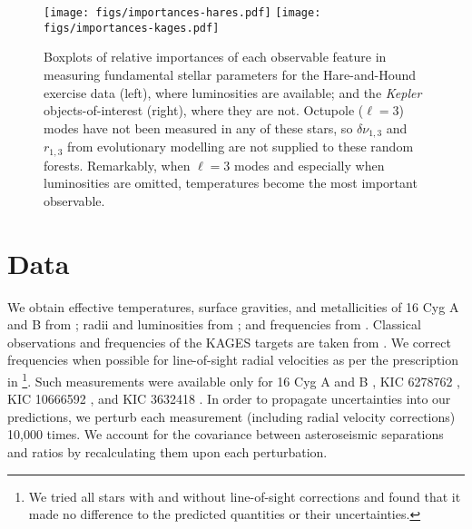 \documentclass[manuscript]{aastex}
\begin{document}
\begin{figure*}
    \centering
    \texttt{[image: figs/importances-hares.pdf]}\hfill
    \texttt{[image: figs/importances-kages.pdf]}
    \caption{Boxplots of relative importances of each observable feature in measuring fundamental stellar parameters for the Hare-and-Hound exercise data (left), where luminosities are available; and the \emph{Kepler} objects-of-interest (right), where they are not. Octupole ($\ell=3$) modes have not been measured in any of these stars, so $\delta\nu_{1,3}$ and $r_{1,3}$ from evolutionary modelling are not supplied to these random forests. Remarkably, when $\ell=3$ modes and especially when luminosities are omitted, temperatures become the most important observable. }
    \label{fig:importances2}
\end{figure*}


\section{Data} 
We obtain effective temperatures, surface gravities, and metallicities of 16 Cyg A and B from \citet{2009A&A...508L..17R}; radii and luminosities from \citet{2013MNRAS.433.1262W}; and frequencies from \citet{2015MNRAS.446.2959D}. Classical observations and frequencies of the KAGES targets are taken from \citet{2015MNRAS.452.2127S}. We correct frequencies when possible for line-of-sight radial velocities as per the prescription in \citet{2014MNRAS.445L..94D}\footnote{We tried all stars with and without line-of-sight corrections and found that it made no difference to the predicted quantities or their uncertainties.}. Such measurements were available only for 16 Cyg A and B \citep{2002ApJS..141..503N}, KIC 6278762 \citep{2002AJ....124.1144L}, KIC 10666592 \citep{2013A&A...554A..84M}, and KIC 3632418 \citep{2006AstL...32..759G}.%
In order to propagate uncertainties into our predictions, we perturb each measurement (including radial velocity corrections) 10,000 times. We account for the covariance between asteroseismic separations and ratios by recalculating them upon each perturbation. 
\end{document}
